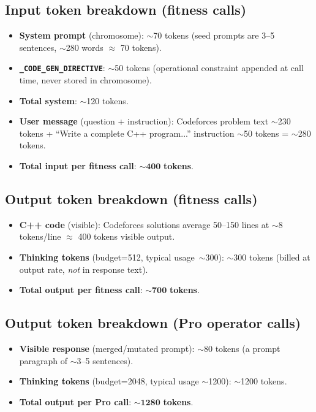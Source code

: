 \documentclass[11pt,a4paper]{report}
\begin{document}
\subsection*{Input token breakdown (fitness calls)}

\begin{itemize}[nosep]
  \item \textbf{System prompt} (chromosome): $\sim$70 tokens (seed prompts are 3--5 sentences,
        $\sim$280 words $\approx$ 70 tokens).
  \item \textbf{\texttt{\_CODE\_GEN\_DIRECTIVE}}: $\sim$50 tokens (operational constraint appended
        at call time, never stored in chromosome).
  \item \textbf{Total system}: $\sim$120 tokens.
  \item \textbf{User message} (question + instruction): Codeforces problem text $\sim$230 tokens
        + ``Write a complete C++ program...'' instruction $\sim$50 tokens = $\sim$280 tokens.
  \item \textbf{Total input per fitness call}: $\mathbf{\sim 400}$ \textbf{tokens}.
\end{itemize}

\subsection*{Output token breakdown (fitness calls)}

\begin{itemize}[nosep]
  \item \textbf{C++ code} (visible): Codeforces solutions average 50--150 lines at $\sim$8
        tokens/line $\approx$ 400 tokens visible output.
  \item \textbf{Thinking tokens} (budget=512, typical usage~$\sim$300): $\sim$300 tokens
        (billed at output rate, \emph{not} in response text).
  \item \textbf{Total output per fitness call}: $\mathbf{\sim 700}$ \textbf{tokens}.
\end{itemize}

\subsection*{Output token breakdown (Pro operator calls)}

\begin{itemize}[nosep]
  \item \textbf{Visible response} (merged/mutated prompt): $\sim$80 tokens
        (a prompt paragraph of $\sim$3--5 sentences).
  \item \textbf{Thinking tokens} (budget=2048, typical usage $\sim$1200): $\sim$1200 tokens.
  \item \textbf{Total output per Pro call}: $\mathbf{\sim 1280}$ \textbf{tokens}.
\end{itemize}
\end{document}
